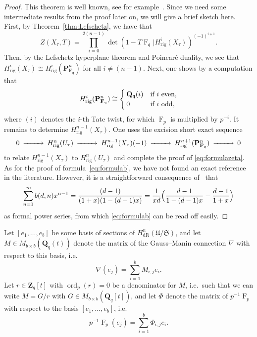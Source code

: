 \documentclass[a4paper,11pt]{article}
\numberwithin{equation}{section}
\newcommand{\ZZ}{\mathbf{Z}} %
\newcommand{\QQ}{\mathbf{Q}} %
\newcommand{\FF}{\mathbf{F}} %
\DeclareMathOperator{\ord}{ord}          %
\DeclareMathOperator{\Frob}{F}           %
\providecommand{\HdR}{H_{\text{dR}}}    %
\providecommand{\Hrig}{H_{\text{rig}}}  %
\theoremstyle{definition}
\begin{document}
\begin{proof}
This theorem is well known, see for example~\citep{AbbottKedlayaRoe2006}. 
Since we need some intermediate results from the proof later on, we will 
give a brief sketch here. First, by Theorem~\ref{thm:Lefschetz}, we have that
\[
Z(X_{\tau},T) = \prod_{i=0}^{2(n-1)} \det(1- T \Frob_{\mathfrak{q}} | \Hrig^i(X_{\tau}))^{(-1)^{i+1}}.
\]
Then, by the Lefschetz hyperplane theorem and Poincar\'e duality, we see 
that $\Hrig^i(X_{\tau}) \cong \Hrig^i(\mathbf{P}^n_{\FF_{\mathfrak{q}}})$ 
for all $i \neq (n-1)$. Next, one shows by a computation that
\begin{equation} \label{eqn:projcoho}
\Hrig^i(\mathbf{P}^n_{\FF_{\mathfrak{q}}}) 
\cong 
\begin{cases}
\QQ_{\mathfrak{q}}(i) &\mbox{if $i$ even,} \\
$0$ &\mbox{if $i$ odd,} 
\end{cases} 
\end{equation}
where $(i)$ denotes the $i$-th Tate twist, for which $\Frob_p$ is multiplied 
by $p^{-i}$. It remains to determine $\Hrig^{n-1}(X_{\tau})$. One uses the 
excision short exact sequence
\begin{equation} \label{eqn:excision}
\begin{CD}
0 @>>> \Hrig^{n}(U_{\tau}) @>>> \Hrig^{n-1}(X_{\tau})(-1) @>>> \Hrig^{n+1}(\mathbf{P}^n_{\FF_{\mathfrak{q}}}) @>>> 0
\end{CD} 
\end{equation}
to relate $\Hrig^{n-1}(X_{\tau})$ to $\Hrig^{n}(U_{\tau})$ and complete 
the proof of \eqref{eq:formulazeta}. As for the proof of 
formula~\eqref{eq:formulab}, we have not found an exact reference 
in the literature. However, it is a straightforward consequence 
of~\citep[Corollaire 2.4 (i)]{sga7} that 
\[
\sum_{n=1}^{\infty} b(d,n) x^{n-1} = \frac{(d-1)}{(1+x)(1-(d-1)x)} = \frac{1}{xd} \Bigl( \frac{d-1}{1-(d-1)x} - \frac{d-1}{1+x} \Bigr)
\] 
as formal power series, from which \eqref{eq:formulab} can be read off easily.
\end{proof}

Let $[e_1, \dotsc, e_b]$ be some basis of sections of 
$\HdR^n(\mathfrak{U}/\mathfrak{S})$, and let $M \in M_{b \times b}(\QQ_q(t))$ 
denote the matrix of the Gauss--Manin connection $\nabla$ with respect 
to this basis, i.e.
\[
\nabla (e_j) = \sum_{i=1}^b M_{i,j} e_i.
\]
Let $r \in \ZZ_q[t]$ with $\ord_p(r)=0$ be a denominator for $M$, i.e.\ such that we can write 
$M = G/r$ with $G \in M_{b \times b}(\QQ_q[t])$, and let $\Phi$ denote the 
matrix of $p^{-1}\Frob_p$ with respect to the basis $[e_1, \dotsc, e_b]$, i.e.\
\[
p^{-1} \Frob_p (e_j) = \sum_{i=1}^b \Phi_{i,j} e_i.
\]
\end{document}
